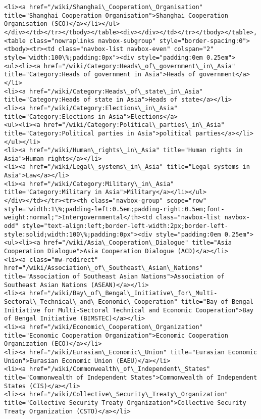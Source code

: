 \documentclass[11pt]{article}
\begin{document}
\begin{Verbatim}[commandchars=\\\{\}]
<li><a href="/wiki/Shanghai\_Cooperation\_Organisation" title="Shanghai Cooperation Organisation">Shanghai Cooperation Organisation (SCO)</a></li></ul>
</div></td></tr></tbody></table><div></div></td></tr></tbody></table>, <table class="nowraplinks navbox-subgroup" style="border-spacing:0"><tbody><tr><td class="navbox-list navbox-even" colspan="2" style="width:100\%;padding:0px"><div style="padding:0em 0.25em">
<ul><li><a href="/wiki/Category:Heads\_of\_government\_in\_Asia" title="Category:Heads of government in Asia">Heads of government</a></li>
<li><a href="/wiki/Category:Heads\_of\_state\_in\_Asia" title="Category:Heads of state in Asia">Heads of state</a></li>
<li><a href="/wiki/Category:Elections\_in\_Asia" title="Category:Elections in Asia">Elections</a>
<ul><li><a href="/wiki/Category:Political\_parties\_in\_Asia" title="Category:Political parties in Asia">political parties</a></li></ul></li>
<li><a href="/wiki/Human\_rights\_in\_Asia" title="Human rights in Asia">Human rights</a></li>
<li><a href="/wiki/Legal\_systems\_in\_Asia" title="Legal systems in Asia">Law</a></li>
<li><a href="/wiki/Category:Military\_in\_Asia" title="Category:Military in Asia">Military</a></li></ul>
</div></td></tr><tr><th class="navbox-group" scope="row" style="width:1\%;padding-left:0.5em;padding-right:0.5em;font-weight:normal;">Intergovernmental</th><td class="navbox-list navbox-odd" style="text-align:left;border-left-width:2px;border-left-style:solid;width:100\%;padding:0px"><div style="padding:0em 0.25em">
<ul><li><a href="/wiki/Asia\_Cooperation\_Dialogue" title="Asia Cooperation Dialogue">Asia Cooperation Dialogue (ACD)</a></li>
<li><a class="mw-redirect" href="/wiki/Association\_of\_Southeast\_Asian\_Nations" title="Association of Southeast Asian Nations">Association of Southeast Asian Nations (ASEAN)</a></li>
<li><a href="/wiki/Bay\_of\_Bengal\_Initiative\_for\_Multi-Sectoral\_Technical\_and\_Economic\_Cooperation" title="Bay of Bengal Initiative for Multi-Sectoral Technical and Economic Cooperation">Bay of Bengal Initiative (BIMSTEC)</a></li>
<li><a href="/wiki/Economic\_Cooperation\_Organization" title="Economic Cooperation Organization">Economic Cooperation Organization (ECO)</a></li>
<li><a href="/wiki/Eurasian\_Economic\_Union" title="Eurasian Economic Union">Eurasian Economic Union (EAEU)</a></li>
<li><a href="/wiki/Commonwealth\_of\_Independent\_States" title="Commonwealth of Independent States">Commonwealth of Independent States (CIS)</a></li>
<li><a href="/wiki/Collective\_Security\_Treaty\_Organization" title="Collective Security Treaty Organization">Collective Security Treaty Organization (CSTO)</a></li>

\end{Verbatim}
\end{document}
